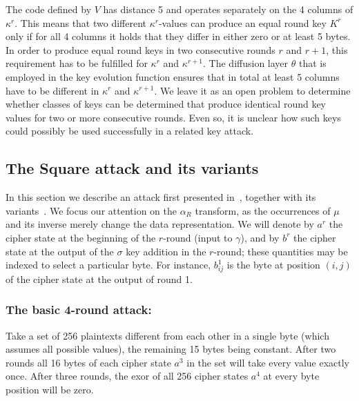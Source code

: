 \documentclass{llncs}
\begin{document}
The code defined by $V$ has distance 5 and operates separately on the 4 columns
of $\kappa^r$. This means that two different $\kappa^r$-values can produce an equal
round key $K^r$ only if for all 4 columns it holds that
they differ in either zero or at least 5 bytes. In order to produce equal round
keys in two consecutive rounds $r$ and $r+1$, this requirement has to be fulfilled
for $\kappa^r$ and $\kappa^{r+1}$. The diffusion layer $\theta$ that is employed
in the key evolution function ensures that in total at least 5 columns have to
be different in $\kappa^r$ and $\kappa^{r+1}$. We leave it as an open problem
to determine whether classes of keys can be determined that produce identical
round key values for two or more consecutive rounds. Even so, it is unclear
how such keys could possibly be used successfully in a related key attack.


\subsection{The Square attack and its variants}

In this section we describe an attack first presented
in~\cite{square}, together with its variants~\cite{partial-sum}.
We focus our attention on the $\alpha_R$ transform, as the
occurrences of $\mu$ and its inverse merely change the data
representation. We will denote by $a^r$ the cipher state at the
beginning of the $r$-round (input to $\gamma$), and by $b^r$ the
cipher state at the output of the $\sigma$ key addition in the
$r$-round; these quantities may be indexed to select a particular
byte. For instance, $b^1_{ij}$ is the byte at position $(i, j)$
of the cipher state at the output of round 1.

%

\subsubsection{The basic 4-round attack:}
Take a set of 256 plaintexts different from each other in a
single byte (which assumes all possible values), the remaining 15
bytes being constant. After two rounds all 16 bytes of each
cipher state $a^3$ in the set will take every value exactly once.
After three rounds, the exor of all 256 cipher states $a^4$ at
every byte position will be zero.
\end{document}
